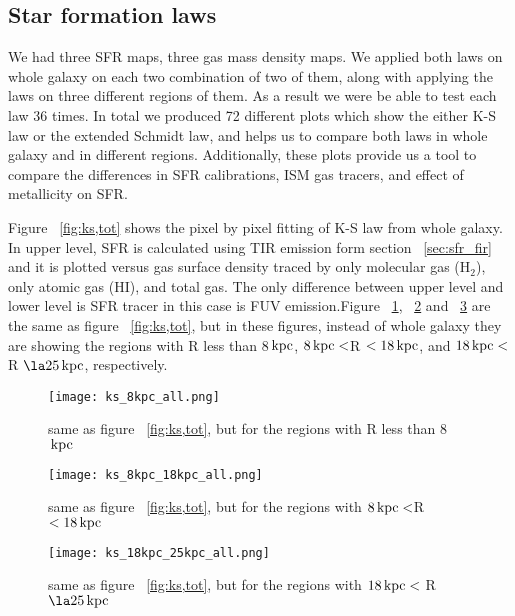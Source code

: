 \documentclass[useAMS,usenatbib]{mn2e}
\newcommand \kpc        {\,{\rm kpc}}
\begin{document}
\subsection{Star formation laws}
We had three SFR maps, three gas mass density maps. We applied both laws on whole galaxy on each two combination of two of them, along with applying the laws on three different regions of them. As a result we were be able to test each law 36 times. In total we produced 72 different plots which show the either K-S law or the extended Schmidt law, and helps us to compare both laws in whole galaxy and in different regions. Additionally, these plots provide us a tool to compare the differences in SFR calibrations, ISM gas tracers, and effect of metallicity on SFR.    

Figure ~\ref{fig:ks,tot} shows the pixel by pixel fitting of K-S law from whole galaxy. In upper level, SFR is calculated using TIR emission form section ~\ref{sec:sfr_fir} and it is plotted versus gas surface density traced by only molecular gas (H$_2$),  only atomic gas (HI), and total gas. The only difference between upper level and lower level is SFR tracer in this case is FUV emission.Figure ~\ref{fig:ks,8}, ~\ref{fig:ks,18} and ~\ref{fig:ks,25} are the same as figure ~\ref{fig:ks,tot}, but in these figures, instead of whole galaxy they are showing the regions with R less than 8$\kpc$, $8\kpc < $R $< 18\kpc$, and $18\kpc <$ R $\la 25\kpc$, respectively.  

\begin{figure*}
\centering
\texttt{[image: ks\_8kpc\_all.png]}
\caption{same as figure ~\ref{fig:ks,tot}, but for the regions with R less than 8$\kpc$ }
\label{fig:ks,8}
\end{figure*}

\begin{figure*}
\centering
\texttt{[image: ks\_8kpc\_18kpc\_all.png]}
\caption{same as figure ~\ref{fig:ks,tot}, but for the regions with $8\kpc < $R $< 18\kpc$}
\label{fig:ks,18}
\end{figure*}

\begin{figure*}
\centering
\texttt{[image: ks\_18kpc\_25kpc\_all.png]}
\caption{same as figure ~\ref{fig:ks,tot}, but for the regions with $18\kpc <$ R $\la 25\kpc$}
\label{fig:ks,25}
\end{figure*}
\end{document}
